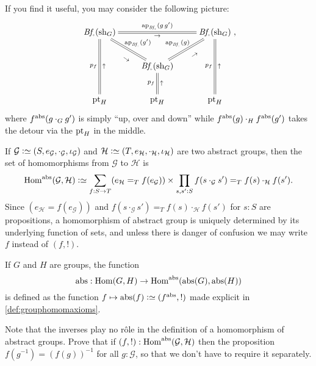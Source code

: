 \begin{remark}
\begin{enumerate}
If you find it useful, you may consider the following picture:
\begin{displaymath}
  \xymatrix{
\Bf_\div(\sh_G)\ar@{=}[rr]^{\ap{\Bf_\div}(g\, g')}_\to\ar@{=}[dr]^{\ap{\Bf_\div}(g')}_{\rotatebox{-35}{\footnotesize$\to$}} \ar@{=}[dd]_{p_f}^\uparrow
&&\Bf_\div(\sh_G)\ar@{=}[dd]_{p_f}^\uparrow\\
&\Bf_\div(\sh_G)\ar@{=}[d]_{p_f}^\uparrow
\ar@{=}[ur]^{\ap{\Bf_\div}(g)}_{\rotatebox{35}{\footnotesize$\to$}}
&\\
\pt_H&\pt_H&\pt_H},
\end{displaymath}
where $f^{\mathrm{abs}}(g\cdot_Gg')$ is simply ``up, over and down'' while $f^{\mathrm{abs}}(g)\cdot_Hf^{\mathrm{abs}}(g')$ takes the detour via the $\mathrm{pt}_H$ in the middle.
  \end{enumerate}
\end{remark}
\begin{definition}\label{def:abstrisfunctor}
  If $\mathcal G\defequi(S,e_{\mathcal G},\cdot_{\mathcal G},\iota_{\mathcal G})$ and $\mathcal H\defequi(T,e_{\mathcal H},\cdot_{\mathcal H},\iota_{\mathcal H})$ are two abstract groups, then the set of homomorphisms from $\mathcal G$ to $\mathcal H$ is
 $$\Hom^\abstr(\mathcal G,\mathcal H)
\defequi\sum_{f:S\to T}(e_{\mathcal H}=_Tf(e_{\mathcal G}))\times 
\prod_{s,s':S}f(s\cdot_{\mathcal G}s')=_Tf(s)\cdot_{\mathcal H}f(s').
$$
Since $(e_{\mathcal H}=f(e_{\mathcal G}))$ and
$f(s\cdot_{\mathcal G}s')=_Tf(s)\cdot_{\mathcal H}f(s')$ for $s:S$ are
propositions, a homomorphism of abstract group is uniquely determined
by its underlying function of sets, and unless there is danger of
confusion we may write $f$ instead of $(f,!)$.

If $G$ and $H$ are groups, the function
$$\abstr:\Hom(G,H)\to\Hom^\abstr(\abstr(G),\abstr(H))$$
is defined as the function $f\mapsto \abstr(f)\defequi(f^\abstr,!)$
made explicit in \cref{def:grouphomomaxioms}.
\end{definition}
\begin{xca}
  Note that the inverses play no r\^ole in the definition of a homomorphism of abstract groups.  Prove that if $(f,!):\Hom^\abstr(\mathcal G,\mathcal H)$
  then the proposition $f(g^{-1})=(f(g))^{-1}$ for all $g:\mathcal
  G$, so that we don't have to require it separately.
\end{xca}
